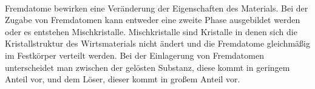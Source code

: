\documentclass[11pt,a4paper]{article}
\numberwithin{equation}{section}
\numberwithin{figure}{section}
\begin{document}
\\
\begin{addmargin}[25pt]{0pt}   
Fremdatome bewirken eine Veränderung der Eigenschaften des Materials. Bei der Zugabe von Fremdatomen kann entweder eine zweite Phase ausgebildet werden oder es entstehen Mischkristalle. Mischkristalle sind Kristalle in denen sich die Kristallstruktur des Wirtsmaterials nicht ändert und die Fremdatome gleichmäßig im Festkörper verteilt werden. Bei der Einlagerung von Fremdatomen unterscheidet man zwischen der gelösten Substanz, diese kommt in geringem Anteil vor, und dem Löser, dieser kommt in großem Anteil vor. \\
\end{addmargin}
\end{document}
